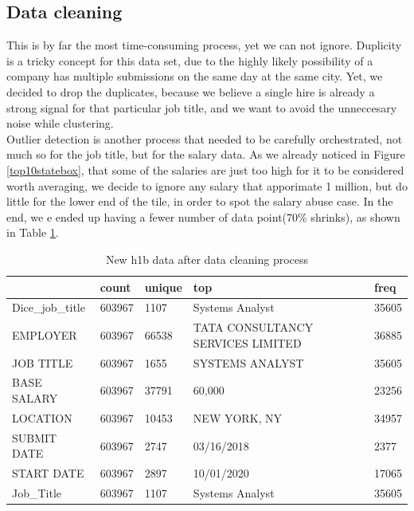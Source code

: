 \subsection{Data cleaning}
This is by far the most time-consuming process, yet we can not ignore. Duplicity is a tricky concept for this data set, due to the highly likely possibility of a company has multiple submissions on the same day at the same city. Yet, we decided to drop the duplicates, because we believe a single hire is already a strong signal for that particular job title, and we want to avoid the unneccesary noise while clustering. \\
Outlier detection is another process that needed to be carefully orchestrated, not  much so for the job title, but for the salary data. As we already noticed in Figure \ref{top10statebox}, that some of the salaries are just too high for it to be considered worth averaging, we decide to ignore any salary that apporimate 1 million, but do little for the lower end of the tile, in order to spot the salary abuse case. In the end, we e ended up having a fewer number of data point(70$\%$ shrinks), as shown in Table \ref{newdata}.
\begin{table}[h!]
	\caption{New h1b data after data cleaning process}
	\label{newdata}
	\resizebox{\columnwidth}{!}
	{%
		
		\begin{tabular}{lllll}
			\hline
			{} &   count & unique &                                                top &   freq \\
			\hline
			Dice\_job\_title &  603967 &   1107 &                                    Systems Analyst &  35605 \\
			EMPLOYER       &  603967 &  66538 &                  TATA CONSULTANCY SERVICES LIMITED &  36885 \\
			JOB TITLE      &  603967 &   1655 &                                    SYSTEMS ANALYST &  35605 \\
			BASE SALARY    &  603967 &  37791 &                                             60,000 &  23256 \\
			LOCATION       &  603967 &  10453 &                                       NEW YORK, NY &  34957 \\
			SUBMIT DATE    &  603967 &   2747 &                                         03/16/2018 &   2377 \\
			START DATE     &  603967 &   2897 &                                         10/01/2020 &  17065 \\
			Job\_Title      &  603967 &   1107 &                                    Systems Analyst &  35605 \\
			\hline
		\end{tabular}
		
	}

\end{table}

